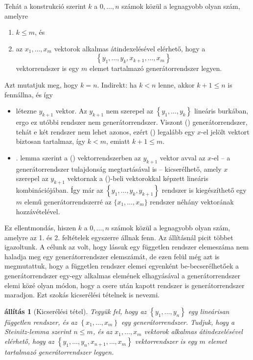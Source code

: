 \documentclass[a4paper, showtrims]{memoir}
\makeatletter
\renewenvironment{proof}[1][\proofname]
    {\par\pushQED{\qed}%
    \normalfont \topsep6\p@\@plus6\p@\relax
    \trivlist
    \item[\hskip\labelsep
        \itshape
    #1\@addpunct{:}]\ignorespaces}
    {\popQED\endtrivlist\@endpefalse}
\theoremstyle{plain}
\newtheorem{proposition}{állítás}[chapter]
\theoremstyle{remark}
\theoremstyle{definition}
\makeatother
\begin{document}
\begin{proof}
    Tehát a konstrukció szerint $k$ a $0,\ldots,n$ számok közül a legnagyobb olyan szám, amelyre
	\begin{enumerate}
		\item $k\leq m$, és
		\item az $x_1,\ldots,x_m$ vektorok alkalmas átindexelésével elérhető, hogy a
		      \[
			      \left\{ y_1,\ldots,y_k,x_{k+1},\ldots,x_m \right\}\tag{\dag}
		      \]
		      vektorrendszer is egy $m$ elemet tartalmazó generátorrendszer legyen.
	\end{enumerate}
	Azt mutatjuk meg, hogy $k=n$. 
	Indirekt: ha $k<n$ lenne, akkor $k+1\leq n$ is fennállna, és így
	\begin{itemize}
		\item
		      létezne $y_{k+1}$ vektor.
		      Az $y_{k+1}$ nem szerepel az $\left\{ y_1,\ldots,y_k \right\}$ lineáris burkában, 
              ergo ez utóbbi rendszer nem generátorrendszer.
		      Viszont (\dag) generátorrendszer, tehát e két rendszer nem lehet azonos, ezért (\dag)
              legalább egy $x$-el jelölt vektort biztosan tartalmaz, 
              így $k<m$, emiatt $k+1\leq m$.
		\item
            . lemma szerint a (\dag) vektorrendszerben az $y_{k+1}$ vektor
		      avval az $x$-el
		      -- a generátorrendszer tulajdonság megtartásával is --
		      kicserélhető,
		      amely $x$ szerepel az $y_{k+1}$ vektornak a (\dag)-beli
		      vektorokkal képzett lineáris kombinációjában.
              Így már az $\left\{ y_1,\ldots,y_k,y_{k+1} \right\}$ rendszer is kiegészíthető egy $m$ elemű generátorrendszerré az $\{x_1,\ldots,x_m\}$ rendszer néhány vektorának hozzávételével.
	\end{itemize}
	Ez ellentmondás, hiszen $k$ a $0,\ldots,n$ számok közül a legnagyobb olyan szám,
	amelyre az 1. és 2. feltételek egyszerre állnak fenn.
\end{proof}
Az állításnál picit többet igazoltunk. 
A célunk az volt, hogy lássuk egy független rendszer elemeszáma nem haladja meg egy generátorrendszer elemszámát, de ezen felül még azt is megmutattuk,
hogy a független rendszer elemei egyenként be-becserélhetőek a generátorrendszer 
egy-egy alkalmas elemének elhagyásával a generátorrendszer elemi közé olyan módon, 
hogy a csere után kapott rendszer is generátorrendszer maradjon.
Ezt szokás kicserélési tételnek is nevezni.
\begin{proposition}[Kicserélési tétel]\label{pr:kicserelesi}
	Tegyük fel, hogy az $\left\{ y_1,\ldots,y_n \right\}$ egy lineárisan független rendszer,
	és az
	$\left\{ x_1,\ldots,x_m \right\}$ egy generátorrendszer.
    Tudjuk, hogy a Steinitz-lemma szerint $n\leq m$, és
    az $x_1,\ldots,x_m$ vektorok alkalmas átindexelésével elérhető, hogy az
    \(
        \left\{ y_1,\ldots,y_n,x_{n+1},\ldots,x_m \right\}
    \)
    vektorrendszer is egy $m$ elemet tartalmazó generátorrendszer legyen.
\end{proposition}
\end{document}
